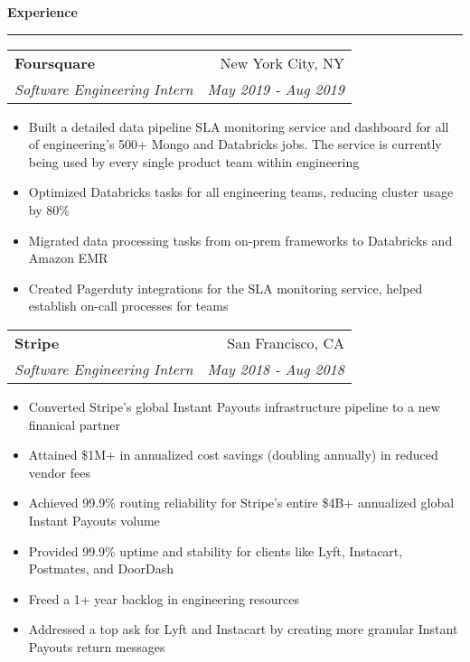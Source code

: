\documentclass[11pt,letterpaper]{article}
\makeatletter
\newenvironment{topic}[1]
    {
    {\Large \centerline{#1}}
    \vspace*{0.03in}
    \hrule 
    \vspace*{0.05in}
    }
    {}
\newenvironment{event}
    {
    \begin{tabular*}{\textwidth}{l@{\extracolsep{\fill}}r}
    }
    {
    \end{tabular*}
    }
\makeatother
\begin{document}
    \begin{topic}{\textbf{Experience}}
        \begin{event}
            \textbf{Foursquare} & New York City, NY \\
            \emph{Software Engineering Intern} & \emph{May 2019 - Aug 2019} \\
        \end{event}
            \begin{itemize}
                \item Built a detailed data pipeline SLA monitoring service and dashboard for all of engineering's 500+ Mongo and Databricks jobs. The service is currently being used by every single product team within engineering
                \item Optimized Databricks tasks for all engineering teams, reducing cluster usage by 80\%
                \item Migrated data processing tasks from on-prem frameworks to Databricks and Amazon EMR
                \item Created Pagerduty integrations for the SLA monitoring service, helped establish on-call processes for teams
            \end{itemize}

        \begin{event}
            \textbf{Stripe} & San Francisco, CA \\
            \emph{Software Engineering Intern} & \emph{May 2018 - Aug 2018} \\
        \end{event}
            \begin{itemize}
                \item Converted Stripe's global Instant Payouts infrastructure pipeline to a new finanical partner
                \setlength{\itemindent}{0.21in}
                \item Attained \$1M+ in annualized cost savings (doubling annually) in reduced vendor fees
                \item Achieved 99.9\% routing reliability for Stripe's entire \$4B+ annualized global Instant Payouts volume
                \item Provided 99.9\% uptime and stability for clients like Lyft, Instacart, Postmates, and DoorDash
                \item Freed a 1+ year backlog in engineering resources
                \setlength{\itemindent}{0in}
                \item Addressed a top ask for Lyft and Instacart by creating more granular Instant Payouts return messages
            \end{itemize}
            

\end{topic}
\end{document}
